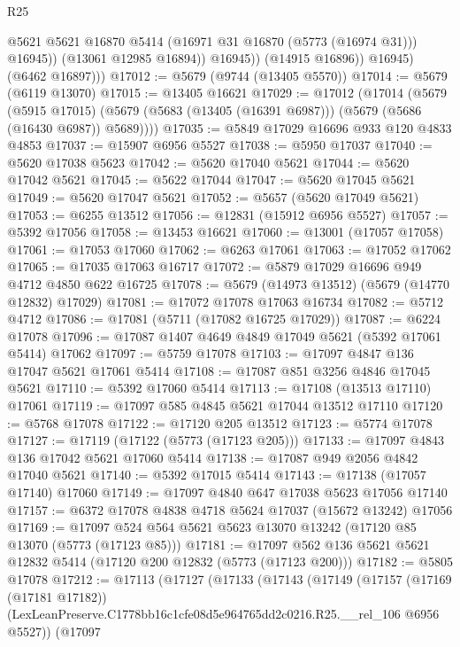 \begin{lexlean}{R25}
\begin{coremodule}
                      @5621
                      @5621
                      @16870
                      @5414
                      (@16971 @31 @16870 (@5773 (@16974 @31)))
                      @16945))
                  (@13061 @12985 @16894))
                @16945))
            (@14915 @16896))
          @16945)
        (@6462 @16897)))
@17012 := @5679 (@9744 (@13405 @5570))
@17014 := @5679 (@6119 @13070)
@17015 := @13405 @16621
@17029 := @17012
    (@17014
      (@5679
        (@5915 @17015)
        (@5679 (@5683 (@13405 (@16391 @6987))) (@5679 (@5686 (@16430 @6987)) @5689))))
@17035 := @5849 @17029 @16696 @933 @120 @4833 @4853
@17037 := @15907 @6956 @5527
@17038 := @5950 @17037
@17040 := @5620 @17038 @5623
@17042 := @5620 @17040 @5621
@17044 := @5620 @17042 @5621
@17045 := @5622 @17044
@17047 := @5620 @17045 @5621
@17049 := @5620 @17047 @5621
@17052 := @5657 (@5620 @17049 @5621)
@17053 := @6255 @13512
@17056 := @12831 (@15912 @6956 @5527)
@17057 := @5392 @17056
@17058 := @13453 @16621
@17060 := @13001 (@17057 @17058)
@17061 := @17053 @17060
@17062 := @6263 @17061
@17063 := @17052 @17062
@17065 := @17035 @17063 @16717
@17072 := @5879 @17029 @16696 @949 @4712 @4850 @622 @16725
@17078 := @5679 (@14973 @13512) (@5679 (@14770 @12832) @17029)
@17081 := @17072 @17078 @17063 @16734
@17082 := @5712 @4712
@17086 := @17081 (@5711 (@17082 @16725 @17029))
@17087 := @6224 @17078
@17096 := @17087 @1407 @4649 @4849 @17049 @5621 (@5392 @17061 @5414) @17062
@17097 := @5759 @17078
@17103 := @17097 @4847 @136 @17047 @5621 @17061 @5414
@17108 := @17087 @851 @3256 @4846 @17045 @5621
@17110 := @5392 @17060 @5414
@17113 := @17108 (@13513 @17110) @17061
@17119 := @17097 @585 @4845 @5621 @17044 @13512 @17110
@17120 := @5768 @17078
@17122 := @17120 @205 @13512
@17123 := @5774 @17078
@17127 := @17119 (@17122 (@5773 (@17123 @205)))
@17133 := @17097 @4843 @136 @17042 @5621 @17060 @5414
@17138 := @17087 @949 @2056 @4842 @17040 @5621
@17140 := @5392 @17015 @5414
@17143 := @17138 (@17057 @17140) @17060
@17149 := @17097 @4840 @647 @17038 @5623 @17056 @17140
@17157 := @6372 @17078 @4838 @4718 @5624 @17037 (@15672 @13242) @17056
@17169 := @17097 @524 @564 @5621 @5623 @13070 @13242 (@17120 @85 @13070 (@5773 (@17123 @85)))
@17181 := @17097 @562 @136 @5621 @5621 @12832 @5414 (@17120 @200 @12832 (@5773 (@17123 @200)))
@17182 := @5805 @17078
@17212 := @17113
    (@17127
      (@17133
        (@17143
          (@17149
            (@17157
              (@17169 (@17181 @17182))
              (LexLeanPreserve.C1778bb16c1cfe08d5e964765dd2c0216.R25.__rel_106 @6956 @5527))
            (@17097

\end{coremodule}
\end{lexlean}
